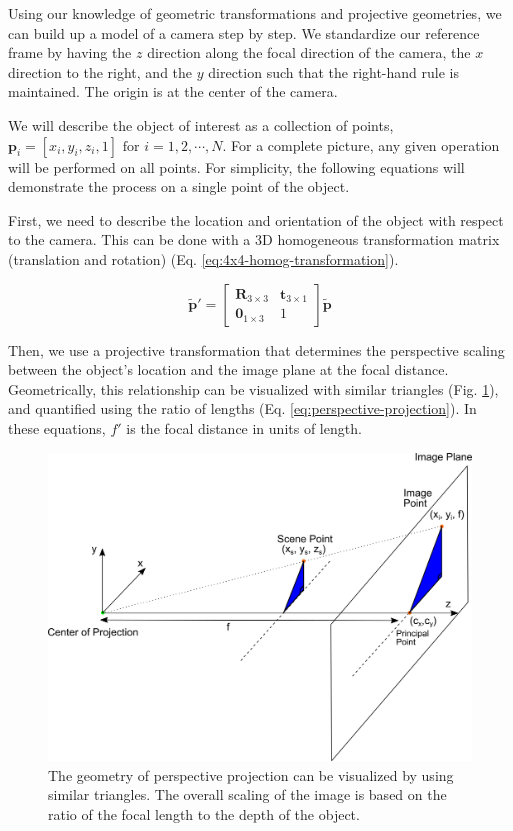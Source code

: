 Using our knowledge of geometric transformations and projective geometries, we can build up a model of a camera step by step. We standardize our reference frame by having the $z$ direction along the focal direction of the camera, the $x$ direction to the right, and the $y$ direction such that the right-hand rule is maintained. The origin is at the center of the camera.

We will describe the object of interest as a collection of points, $\mathbf{p}_i =  [x_i, y_i, z_i, 1] \text{ for } i = 1,2,\cdots,N$. For a complete picture, any given operation will be performed on all points. For simplicity, the following equations will demonstrate the process on a single point of the object.

First, we need to describe the location and orientation of the object with respect to the camera. This can be done with a 3D homogeneous transformation matrix (translation and rotation) (Eq. \ref{eq:4x4-homog-transformation}).

\begin{equation}
    \tilde{\mathbf{p}}' = \begin{bmatrix}
        \mathbf{R}_{3 \times 3} & \mathbf{t}_{3 \times 1} \\ \mathbf{0}_{1 \times 3} & 1
    \end{bmatrix} \tilde{\mathbf{p}}
    \label{eq:4x4-homog-transformation}
\end{equation}

Then, we use a projective transformation that determines the perspective scaling between the object's location and the image plane at the focal distance. Geometrically, this relationship can be visualized with similar triangles (Fig. \ref{fig:perspective-projection}), and quantified using the ratio of lengths (Eq. \ref{eq:perspective-projection}). In these equations, $f'$ is the focal distance in units of length.

\begin{figure}[h!]
    \begin{center}
        \includegraphics[width=0.85\linewidth]{figs/background/png/perspective-projection.png}
    \end{center}
    \caption{The geometry of perspective projection can be visualized by using similar triangles. The overall scaling of the image is based on the ratio of the focal length to the depth of the object.}
    \label{fig:perspective-projection}
\end{figure}


